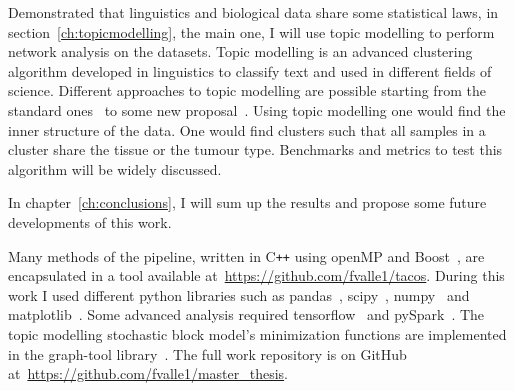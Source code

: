 Demonstrated that linguistics and biological data share some statistical laws, in section~\ref{ch:topicmodelling}, the main one, I will use topic modelling to perform network analysis on the datasets. Topic modelling is an advanced clustering algorithm developed in linguistics to classify text and used in different fields of science. Different approaches to topic modelling are possible starting from the standard ones~\cite{Zhou2016} to some new proposal~\cite{Lancichinetti2015,Martini2017,gerlach2018network}. Using topic modelling one would find the inner structure of the data. One would find clusters such that all samples in a cluster share the tissue or the tumour type. Benchmarks and metrics to test this algorithm will be widely discussed.

In chapter~\ref{ch:conclusions}, I will sum up the results and propose some future developments of this work.

Many methods of the pipeline, written in C\texttt{++} using openMP and Boost~\cite{siek2002boost}, are encapsulated in a tool available at~\url{https://github.com/fvalle1/tacos}. During this work I used different python libraries such as pandas~\cite{mckinney2010data}, scipy~\cite{jones2014scipy}, numpy~\cite{oliphant2006guide} and matplotlib~\cite{hunter2007matplotlib}. Some advanced analysis required tensorflow~\cite{tensorflow2015-whitepaper} and pySpark~\cite{Zaharia:2016:ASU:3013530.2934664}. The topic modelling stochastic block model's minimization functions are implemented in the graph-tool library~\cite{peixoto_graph-tool_2014}. The full work repository is on GitHub\textsuperscript{\tiny\textcopyright} at~\url{https://github.com/fvalle1/master_thesis}.
